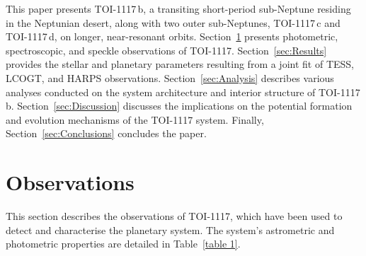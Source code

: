 \documentclass[fleqn,usenatbib,useAMS]{mnras}
\begin{document}
This paper presents TOI-1117\,b, a transiting short-period sub-Neptune residing in the Neptunian desert, along with two outer sub-Neptunes, TOI-1117\,c and TOI-1117\,d, on longer, near-resonant orbits. Section~\ref{sec:Observations} presents photometric, spectroscopic, and speckle observations of TOI-1117. Section~\ref{sec:Results} provides the stellar and planetary parameters resulting from a joint fit of TESS, LCOGT, and HARPS observations. Section~\ref{sec:Analysis} describes various analyses conducted on the system architecture and interior structure of TOI-1117\,b. Section~\ref{sec:Discussion} discusses the implications on the potential formation and evolution mechanisms of the TOI-1117 system. Finally, Section~\ref{sec:Conclusions} concludes the paper.


\section{Observations}
\label{sec:Observations}
This section describes the observations of TOI-1117, which have been used to detect and characterise the planetary system. The system's astrometric and photometric properties are detailed in Table~\ref{table 1}. 
\end{document}
